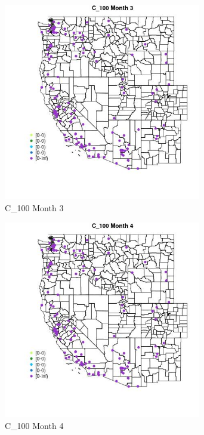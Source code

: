 \begin{figure} 
\centering  
\includegraphics[width=0.77\textwidth]{Code_Outputs/Report_ML_input_PM25_Step4_part_e_de_duplicated_aves_MapObsMo3C_100.jpg} 
\caption{\label{fig:Report_ML_input_PM25_Step4_part_e_de_duplicated_avesMapObsMo3C_100}C_100 Month 3} 
\end{figure} 
 

\begin{figure} 
\centering  
\includegraphics[width=0.77\textwidth]{Code_Outputs/Report_ML_input_PM25_Step4_part_e_de_duplicated_aves_MapObsMo4C_100.jpg} 
\caption{\label{fig:Report_ML_input_PM25_Step4_part_e_de_duplicated_avesMapObsMo4C_100}C_100 Month 4} 
\end{figure} 
 

